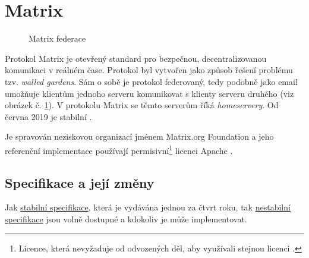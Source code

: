 \section{Matrix}\label{matrix}

\begin{figure}[h]
    \centering
    \caption{Matrix federace}
    \label{federation}
\end{figure}

Protokol Matrix je otevřený standard pro bezpečnou, decentralizovanou komunikaci
v reálném čase. Protokol byl vytvořen jako způsob řešení problému tzv.
\textit{walled gardens}. Sám o sobě je protokol federovaný, tedy podobně jako
email umožňuje klientům jednoho serveru komunikovat s klienty serveru druhého
(viz obrázek č. \ref{federation}). V protokolu Matrix se těmto serverům říká
\textit{homeservery}. Od června 2019 je stabilní
\parencite{MatrixORG-FAQ,MatrixORG-Homepage}.

Je spravován neziskovou organizací jménem Matrix.org Foundation a jeho
referenční implementace používají permisivní\footnote{Licence, která nevyžaduje
    od odvozených děl, aby využívali stejnou licenci
    \parencite{MUNI-FI-VerejneLicenceVCR}.} licenci Apache \parencite{MatrixORG-Homepage}.

\subsection{Specifikace a její změny}\label{spec}

Jak \href{https://spec.matrix.org/latest/}{stabilní specifikace}, která je
vydávána jednou za čtvrt roku, tak
\href{https://spec.matrix.org/unstable/}{nestabilní specifikace} jsou volně
dostupné a kdokoliv je může implementovat.

